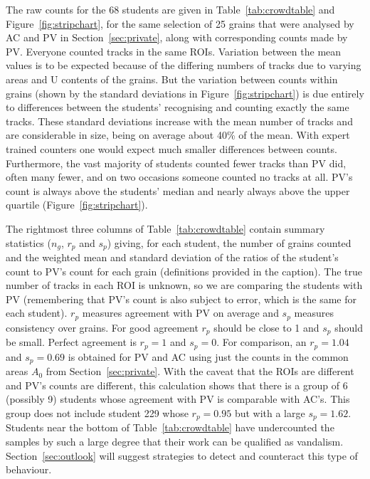 \documentclass[gchron, manuscript]{copernicus}
\begin{document}
The raw counts for the 68 students are given in
Table~\ref{tab:crowdtable} and Figure~\ref{fig:stripchart}, for the
same selection of 25 grains that were analysed by AC and PV in
Section~\ref{sec:private}, along with corresponding counts made by
PV. Everyone counted tracks in the same ROIs. Variation between the
mean values is to be expected because of the differing numbers of
tracks due to varying areas and U contents of the grains. But the
variation between counts within grains (shown by the standard
deviations in Figure~\ref{fig:stripchart}) is due entirely to
differences between the students' recognising and counting exactly the
same tracks. These standard deviations increase with the mean number
of tracks and are considerable in size, being on average about 40\% of
the mean. With expert trained counters one would expect much smaller
differences between counts.  Furthermore, the vast majority of
students counted fewer tracks than PV did, often many fewer, and on
two occasions someone counted no tracks at all. PV's count is always
above the students' median and nearly always above the upper quartile
(Figure~\ref{fig:stripchart}).\medskip

The rightmost three columns of Table~\ref{tab:crowdtable} contain
summary statistics ($n_g$, $r_p$ and $s_p$) giving, for each student,
the number of grains counted and the weighted mean and standard
deviation of the ratios of the student's count to PV's count for each
grain (definitions provided in the caption). The true number of tracks
in each ROI is unknown, so we are comparing the students with PV
(remembering that PV's count is also subject to error, which is the
same for each student). $r_p$ measures agreement with PV on average
and $s_p$ measures consistency over grains. For good agreement $r_p$
should be close to 1 and $s_p$ should be small.  Perfect agreement is
$r_p = 1$ and $s_p = 0$. For comparison, an $r_p = 1.04$ and $s_p =
0.69$ is obtained for PV and AC using just the counts in the common
areas $A_0$ from Section~\ref{sec:private}. With the caveat that the
ROIs are different and PV's counts are different, this calculation
shows that there is a group of 6 (possibly 9) students whose agreement
with PV is comparable with AC's. This group does not include student
229 whose $r_p = 0.95$ but with a large $s_p = 1.62$. Students near
the bottom of Table~\ref{tab:crowdtable} have undercounted the samples
by such a large degree that their work can be qualified as
vandalism. Section~\ref{sec:outlook} will suggest strategies to detect
and counteract this type of behaviour.\medskip
\end{document}
